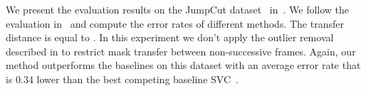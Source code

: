 We present the evaluation results on the JumpCut dataset~\cite{FanTOG15} in~.  We follow the evaluation in~\cite{FanTOG15} and compute the error rates of different methods. The transfer distance  is equal to . In this experiment we don't apply the outlier removal described in  to restrict mask transfer between non-successive frames. Again, our method outperforms the baselines on this dataset with an average error rate that is 0.34 lower than the best competing baseline SVC~\cite{WangTIP2017}.
\begin{table}[t]
	\centering
	{\small
		\caption{Error rates on the JumpCut dataset~\cite{FanTOG15}. The transfer distance  is .
		}
		\label{tab:jumpcut}
		\tabcolsep=3pt
		}
\end{table}
